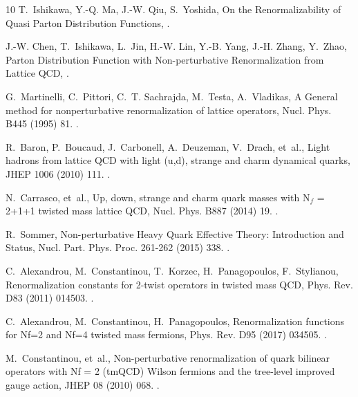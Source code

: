 \begin{thebibliography}{10}
T.~Ishikawa, Y.-Q. Ma, J.-W. Qiu, S.~Yoshida, {On the Renormalizability of
  Quasi Parton Distribution Functions, }\href {http://arxiv.org/abs/1707.03107}
  {}.

J.-W. Chen, T.~Ishikawa, L.~Jin, H.-W. Lin, Y.-B. Yang, J.-H. Zhang, Y.~Zhao,
  {Parton Distribution Function with Non-perturbative Renormalization from
  Lattice QCD, }\href {http://arxiv.org/abs/1706.01295}
  {}.

G.~Martinelli, C.~Pittori, C.~T. Sachrajda, M.~Testa, A.~Vladikas, {A General
  method for nonperturbative renormalization of lattice operators}, Nucl. Phys.
  B445 (1995) 81.
\newblock \href {http://arxiv.org/abs/hep-lat/9411010}
  {}.

R.~Baron, P.~Boucaud, J.~Carbonell, A.~Deuzeman, V.~Drach, et~al., {Light
  hadrons from lattice QCD with light (u,d), strange and charm dynamical
  quarks}, JHEP 1006 (2010) 111.
\newblock \href {http://arxiv.org/abs/1004.5284} {}.

N.~Carrasco, et~al., {Up, down, strange and charm quark masses with N$_f$ =
  2+1+1 twisted mass lattice QCD}, Nucl. Phys. B887 (2014) 19.
\newblock \href {http://arxiv.org/abs/1403.4504} {}.

R.~Sommer, {Non-perturbative Heavy Quark Effective Theory: Introduction and
  Status}, Nucl. Part. Phys. Proc. 261-262 (2015) 338.
\newblock \href {http://arxiv.org/abs/1501.03060} {}.

C.~Alexandrou, M.~Constantinou, T.~Korzec, H.~Panagopoulos, F.~Stylianou,
  {Renormalization constants for 2-twist operators in twisted mass QCD}, Phys.
  Rev. D83 (2011) 014503.
\newblock \href {http://arxiv.org/abs/1006.1920} {}.

C.~Alexandrou, M.~Constantinou, H.~Panagopoulos, {Renormalization functions for
  Nf=2 and Nf=4 twisted mass fermions}, Phys. Rev. D95 (2017) 034505.
\newblock \href {http://arxiv.org/abs/1509.00213} {}.

M.~Constantinou, et~al., {Non-perturbative renormalization of quark bilinear
  operators with Nf = 2 (tmQCD) Wilson fermions and the tree-level improved
  gauge action}, JHEP 08 (2010) 068.
\newblock \href {http://arxiv.org/abs/1004.1115} {}.


\end{thebibliography}
